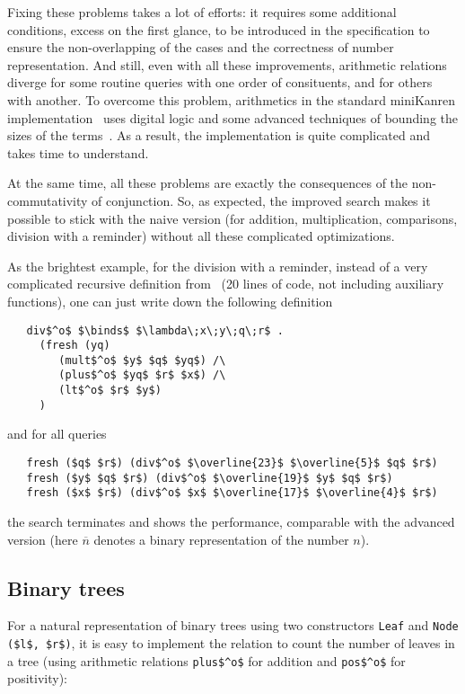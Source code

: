 Fixing these problems takes a lot of efforts: it requires some additional conditions, 
excess on the first glance, to be introduced in the specification to ensure the non-overlapping 
of the cases and the correctness of number representation. And still, even with all these 
improvements, arithmetic relations diverge for some routine queries with one order of 
consituents, and for others with another. To overcome this problem, 
arithmetics in the standard miniKanren implementation~\cite{TRS} uses digital logic and 
some advanced techniques of bounding the sizes of the terms~\cite{KiselyovArithmetic}. 
As a result, the implementation is quite complicated and takes time to understand.

At the same time, all these problems are exactly the consequences of the non-commutativity 
of conjunction. So, as expected, the improved search makes it possible to stick with
the naive version (for addition, multiplication, comparisons, division with a reminder)
without all these complicated optimizations. 

As the brightest example, for the division with a reminder, instead of a very complicated recursive definition 
from~\cite{TRS} (20 lines of code, not including auxiliary functions), one can just write down the 
following definition

\begin{lstlisting}
   div$^o$ $\binds$ $\lambda\;x\;y\;q\;r$ . 
     (fresh (yq)        
        (mult$^o$ $y$ $q$ $yq$) /\
        (plus$^o$ $yq$ $r$ $x$) /\
        (lt$^o$ $r$ $y$)
     )
\end{lstlisting}

\noindent and for all queries

\begin{lstlisting}
   fresh ($q$ $r$) (div$^o$ $\overline{23}$ $\overline{5}$ $q$ $r$)
   fresh ($y$ $q$ $r$) (div$^o$ $\overline{19}$ $y$ $q$ $r$)
   fresh ($x$ $r$) (div$^o$ $x$ $\overline{17}$ $\overline{4}$ $r$)
\end{lstlisting}

\noindent the search terminates and shows the performance, comparable with the advanced version 
(here $\overline{n}$ denotes a binary representation of the number $n$).

\subsection{Binary trees}

For a natural representation of binary trees using two constructors \lstinline|Leaf| and 
\lstinline|Node ($l$, $r$)|, it is easy to implement the relation to count the number of 
leaves in a tree (using arithmetic relations \lstinline|plus$^o$| for addition and \lstinline|pos$^o$|
for positivity):

